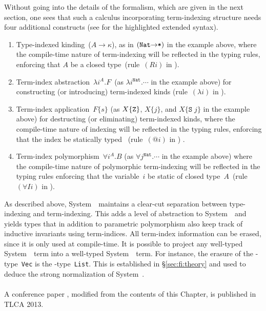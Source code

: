 Without going into the details of the formalism, which are given in the
next section, one sees that such a calculus incorporating term-indexing
structure needs four additional constructs (see  for the
highlighted extended syntax).
\begin{enumerate}
\item 
  Type-indexed kinding~($A\to\kappa$), as in $(\texttt{{Nat}\ensuremath{\to}*})$
  in the example above, where the compile-time nature of term-indexing
  will be reflected in the typing rules, enforcing that $A$ be a closed
  type~(rule~$(Ri)$ in ).

\item 
  Term-index abstraction~$\lambda i^A.F$~(as $\lambda
  i^{\texttt{{Nat}}}.\cdots$ in the example above) for constructing (or
  introducing) term-indexed kinds (rule~$(\lambda i)$ in
  ).  

\item 
  Term-index application~$F\{s\}$ (as $X\{{\tt Z}\}$, $X\{j\}$, and
  $X\{\texttt{S}\;j\}$ in the example above) for destructing (or
  eliminating) term-indexed kinds, where the compile-time nature of
  indexing will be reflected in the typing rules, enforcing that the index be
  statically typed%
~(rule~$(@i)$ in ) .

\item 
  Term-index polymorphism~$\forall i^A.B$ (as $\forall
  j^{\texttt{{Nat}}}.\cdots$ in the example above) where the compile-time
  nature of polymorphic term-indexing will be reflected in the typing rules enforcing
  that the variable~$i$ be static of closed type~$A$~(rule~$(\forall
  Ii)$ in ).
\end{enumerate}

As described above, System~\Fi\ maintains a clear-cut separation between
type-indexing and term-indexing.  This adds a level of abstraction
to System~\Fw\ and yields types that in addition to parametric polymorphism
also keep track of inductive invariants using term-indices. All term-index
information can be erased, since it is only used at compile-time.  
It is possible to project any well-typed System~\Fi\ term into
a well-typed System~\Fw\ term.
For instance, the erasure of the \Fi-type~\texttt{Vec}
is the \Fw-type~\texttt{List}.  This is established in
\S\ref{sec:fi:theory} and used to deduce the strong normalization of
System~\Fi.

\paragraph{}
A conference paper \cite{AhnSheFioPit13}, modified from
the contents of this Chapter, is published in TLCA 2013.






